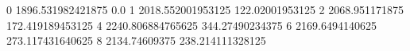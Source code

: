 0 1896.531982421875 0.0
1 2018.552001953125 122.02001953125
2 2068.951171875 172.419189453125
4 2240.806884765625 344.27490234375
6 2169.6494140625 273.117431640625
8 2134.74609375 238.214111328125

